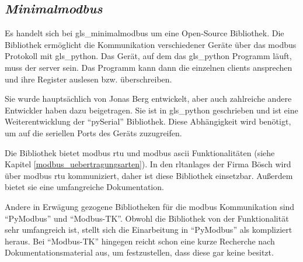 \subsection{\textit{Minimalmodbus}} \label{minimalmodbus}
Es handelt sich bei \gls{gls_minimalmodbus} um eine Open-Source Bibliothek. Die Bibliothek ermöglicht die Kommunikation verschiedener Geräte über das \gls{modbus} Protokoll mit \gls{gls_python}. Das Gerät, auf dem das \gls{gls_python} Programm läuft, muss der \gls{server} sein. Das Programm kann dann die einzelnen \gls{client}s ansprechen und ihre Register auslesen bzw. überschreiben.

Sie wurde hauptsächlich von Jonas Berg entwickelt, aber auch zahlreiche andere Entwickler haben dazu beigetragen. Sie ist in \gls{gls_python} geschrieben und ist eine Weiterentwicklung der \enquote{pySerial} Bibliothek. Diese Abhängigkeit wird benötigt, um auf die seriellen Ports des Geräts zuzugreifen. \cite[vgl.][]{Liechti_pySerial:o.J.}

Die Bibliothek bietet \gls{modbus} \acs{rtu} und \gls{modbus} \acs{ascii} Funktionalitäten (siehe Kapitel \ref{modbus_uebertragungsarten}). In den \acp{rltanlage} der Firma Bösch wird über \gls{modbus} \acs{rtu} kommuniziert, daher ist diese Bibliothek einsetzbar. Außerdem bietet sie eine umfangreiche Dokumentation.
\cite[vgl.][]{Berg_MiniModbus:2023, Berg_MiniModbus_Git:2023} 

Andere in Erwägung gezogene Bibliotheken für die \gls{modbus} Kommunikation sind \enquote{PyModbus} und \enquote{Modbus-TK}. Obwohl die Bibliothek von der Funktionalität sehr umfangreich ist, stellt sich die Einarbeitung in \enquote{PyModbus} als kompliziert heraus. Bei \enquote{Modbus-TK} hingegen reicht schon eine kurze Recherche nach Dokumentationsmaterial aus, um festzustellen, dass diese gar keine besitzt.